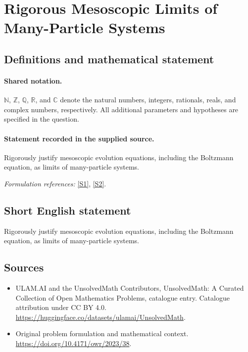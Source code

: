 \documentclass[11pt]{article}
\newcommand{\sref}[2]{\hyperlink{source:#1:#2}{[S#2]}}
\begin{document}
\section{Rigorous Mesoscopic Limits of Many-Particle Systems}\label{statement}

\subsection{Definitions and mathematical statement}

\paragraph{Shared notation.}$\mathbb N$, $\mathbb Z$, $\mathbb Q$, $\mathbb R$, and $\mathbb C$ denote the natural numbers, integers, rationals, reals, and complex numbers, respectively. All additional parameters and hypotheses are specified in the question.


\paragraph{Statement recorded in the supplied source.}
Rigorously justify mesoscopic evolution equations, including the Boltzmann equation, as limits of many-particle systems.
\par\smallskip\textit{Formulation references:} \sref{statement}{1}, \sref{statement}{2}.
\subsection{Short English statement}
Rigorously justify mesoscopic evolution equations, including the Boltzmann equation, as limits of many-particle systems.
\subsection{Sources}
\begin{itemize}
\item[\hypertarget{source:statement:1}{S1}] ULAM.AI and the UnsolvedMath Contributors, UnsolvedMath: A Curated Collection of Open Mathematics Problems, catalogue entry. Catalogue attribution under CC BY 4.0.
\url{https://huggingface.co/datasets/ulamai/UnsolvedMath}.
\item[\hypertarget{source:statement:2}{S2}] Original problem formulation and mathematical context.
\url{https://doi.org/10.4171/owr/2023/38}.
\end{itemize}
\label{end:statement}
\end{document}
